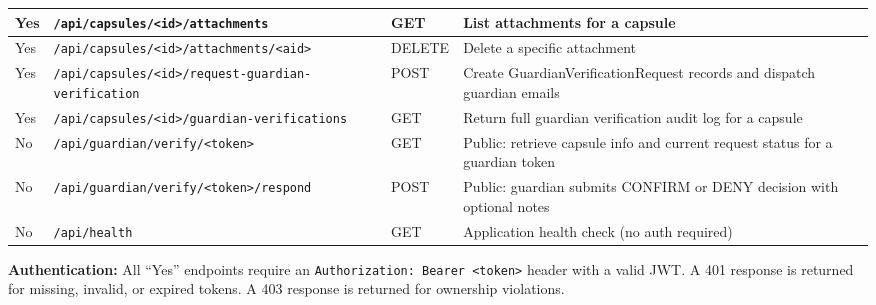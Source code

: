 \documentclass[12pt, a4paper]{article}
\begin{document}
\begin{appendices}
\begin{longtable}{|p{1cm}|p{4.5cm}|l|p{6cm}|}
\hline
Yes & \texttt{/api/capsules/<id>/attachments} & GET    & List attachments for a capsule \\
\hline
Yes & \texttt{/api/capsules/<id>/attachments/<aid>} & DELETE & Delete a specific attachment \\
\hline
Yes & \texttt{/api/capsules/<id>/request-guardian-verification} & POST & Create GuardianVerificationRequest records and dispatch guardian emails \\
\hline
Yes & \texttt{/api/capsules/<id>/guardian-verifications} & GET & Return full guardian verification audit log for a capsule \\
\hline
No  & \texttt{/api/guardian/verify/<token>} & GET & Public: retrieve capsule info and current request status for a guardian token \\
\hline
No  & \texttt{/api/guardian/verify/<token>/respond} & POST & Public: guardian submits CONFIRM or DENY decision with optional notes \\
\hline
No  & \texttt{/api/health}                & GET    & Application health check (no auth required) \\
\hline

\end{longtable}

\noindent\textbf{Authentication:} All ``Yes'' endpoints require an \texttt{Authorization: Bearer <token>} header with a valid JWT. A 401 response is returned for missing, invalid, or expired tokens. A 403 response is returned for ownership violations.

\end{appendices}

\end{document}
